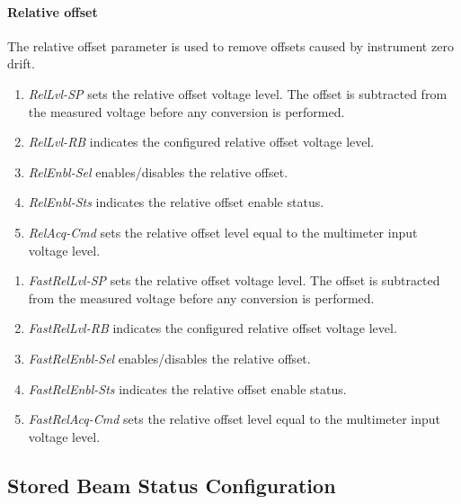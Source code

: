 \documentclass[openany]{article}
\begin{document}
	\bigskip
	\noindent{}

		\paragraph{Relative offset}\label{relative-offset} The relative offset parameter is used to remove offsets caused by instrument zero drift.

			\noindent{}

			\begin{enumerate}
				\item \emph{RelLvl-SP} sets the relative offset voltage level. The offset is subtracted from the measured voltage before any conversion is performed.
				\item \emph{RelLvl-RB} indicates the configured relative offset voltage level.
				\item \emph{RelEnbl-Sel} enables/disables the relative offset.
				\item \emph{RelEnbl-Sts} indicates the relative offset enable status.
				\item \emph{RelAcq-Cmd} sets the relative offset level equal to the multimeter input voltage level.
			\end{enumerate}

			\noindent{}

			\begin{enumerate}
				\item \emph{FastRelLvl-SP} sets the relative offset voltage level. The offset is subtracted from the measured voltage before any conversion is performed.
				\item \emph{FastRelLvl-RB} indicates the configured relative offset voltage level.
				\item \emph{FastRelEnbl-Sel} enables/disables the relative offset.
				\item \emph{FastRelEnbl-Sts} indicates the relative offset enable status.
				\item \emph{FastRelAcq-Cmd} sets the relative offset level equal to the multimeter input voltage level.
			\end{enumerate}

	\subsection{Stored Beam Status Configuration}
\end{document}
